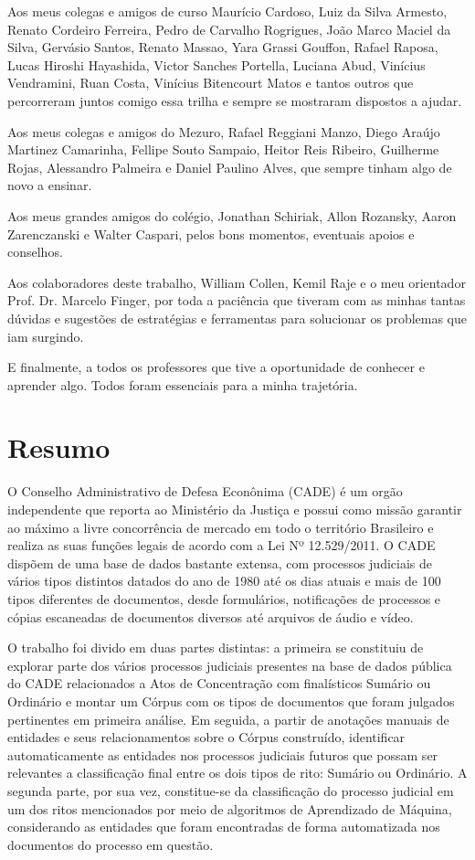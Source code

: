 \documentclass[11pt]{report}
\begin{document}
Aos meus colegas e amigos de curso Maurício Cardoso, Luiz da Silva Armesto, Renato Cordeiro Ferreira, Pedro de Carvalho Rogrigues, João Marco Maciel da Silva,
Gervásio Santos, Renato Massao, Yara Grassi Gouffon, Rafael Raposa, Lucas Hiroshi Hayashida, Victor Sanches Portella, Luciana Abud, Vinícius Vendramini, Ruan Costa,
Vinícius Bitencourt Matos e tantos outros que percorreram juntos comigo essa trilha e sempre se mostraram dispostos a ajudar.

Aos meus colegas e amigos do Mezuro, Rafael Reggiani Manzo, Diego Araújo Martinez Camarinha, Fellipe Souto Sampaio, Heitor Reis Ribeiro, Guilherme Rojas, Alessandro Palmeira e
Daniel Paulino Alves, que sempre tinham algo de novo a ensinar.

Aos meus grandes amigos do colégio, Jonathan Schiriak, Allon Rozansky, Aaron Zarenczanski e Walter Caspari, pelos bons momentos, eventuais apoios e conselhos.

Aos colaboradores deste trabalho, William Collen, Kemil Raje e o meu orientador Prof. Dr. Marcelo Finger, por toda a paciência que tiveram com as minhas tantas dúvidas e
sugestões de estratégias e ferramentas para solucionar os problemas que iam surgindo.

E finalmente, a todos os professores que tive a oportunidade de conhecer e aprender algo. Todos foram essenciais para a minha trajetória.

\pagebreak
\thispagestyle{empty}
\section*{Resumo}

\indent\indent O Conselho Administrativo de Defesa Econônima (CADE) é um orgão independente que reporta ao Ministério da Justiça e possui como missão garantir ao máximo a livre
concorrência de mercado em todo o território Brasileiro e realiza as suas funções legais de acordo com a Lei Nº 12.529/2011. O CADE dispõem de uma base de dados bastante extensa,
com processos judiciais de vários tipos distintos datados do ano de 1980 até os dias atuais e mais de 100 tipos diferentes de documentos, desde formulários, notificações de processos
e cópias escaneadas de documentos diversos até arquivos de áudio e vídeo.

O trabalho foi divido em duas partes distintas: a primeira se constituiu de explorar parte dos vários processos judiciais presentes na base de dados pública do CADE relacionados a Atos de
Concentração com finalísticos Sumário ou Ordinário e montar um Córpus com os tipos de documentos que foram julgados pertinentes em primeira análise. Em seguida, a partir de anotações
manuais de entidades e seus relacionamentos sobre o Córpus construído, identificar automaticamente as entidades nos processos judiciais futuros que possam ser relevantes a classificação
final entre os dois tipos de rito: Sumário ou Ordinário. A segunda parte, por sua vez, constitue-se da classificação do processo judicial em um dos ritos mencionados por meio de
algoritmos de Aprendizado de Máquina, considerando as entidades que foram encontradas de forma automatizada nos documentos do processo em questão.
\end{document}
